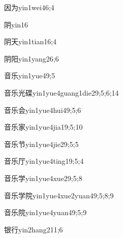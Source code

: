 \begin{verbete}{因为}{yin1wei4}{6;4}
\end{verbete}
\begin{verbete}{阴}{yin1}{6}
\end{verbete}
\begin{verbete}{阴天}{yin1tian1}{6;4}
\end{verbete}
\begin{verbete}{阴阳}{yin1yang2}{6;6}
\end{verbete}
\begin{verbete}{音乐}{yin1yue4}{9;5}
\end{verbete}
\begin{verbete}{音乐光碟}{yin1yue4guang1die2}{9;5;6;14}
\end{verbete}
\begin{verbete}{音乐会}{yin1yue4hui4}{9;5;6}
\end{verbete}
\begin{verbete}{音乐家}{yin1yue4jia1}{9;5;10}
\end{verbete}
\begin{verbete}{音乐节}{yin1yue4jie2}{9;5;5}
\end{verbete}
\begin{verbete}{音乐厅}{yin1yue4ting1}{9;5;4}
\end{verbete}
\begin{verbete}{音乐学}{yin1yue4xue2}{9;5;8}
\end{verbete}
\begin{verbete}{音乐学院}{yin1yue4xue2yuan4}{9;5;8;9}
\end{verbete}
\begin{verbete}{音乐院}{yin1yue4yuan4}{9;5;9}
\end{verbete}
\begin{verbete}{银行}{yin2hang2}{11;6}
\end{verbete}

